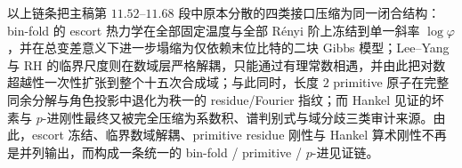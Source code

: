 \noindent
以上链条把主稿第 \(11.52\)–\(11.68\) 段中原本分散的四类接口压缩为同一闭合结构：bin-fold 的 escort 热力学在全部固定温度与全部 Rényi 阶上冻结到单一斜率 \(\log\varphi\)，并在总变差意义下进一步塌缩为仅依赖末位比特的二块 Gibbs 模型；Lee--Yang 与 RH 的临界尺度则在数域层严格解耦，只能通过有理常数相遇，并由此把对数超越性一次性扩张到整个十五次合成域；与此同时，长度 \(2\) primitive 原子在完整同余分解与角色投影中退化为秩一的 residue/Fourier 指纹；而 Hankel 见证的坏素与 \(p\)-进刚性最终又被完全压缩为系数积、谱判别式与域分歧三类审计来源。由此，escort 冻结、临界数域解耦、primitive residue 刚性与 Hankel 算术刚性不再是并列输出，而构成一条统一的 bin-fold / primitive / \(p\)-进见证链。

